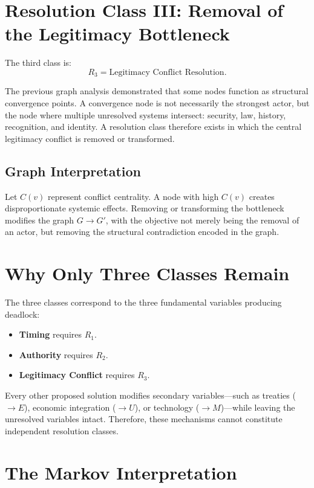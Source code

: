 \documentclass[11pt,openany]{book}
\theoremstyle{plain}
\theoremstyle{definition}
\begin{document}
\section*{Resolution Class III: Removal of the Legitimacy Bottleneck}

The third class is:
\[
R_3 = \text{Legitimacy Conflict Resolution}.
\]

The previous graph analysis demonstrated that some nodes function as structural convergence points. A convergence node is not necessarily the strongest actor, but the node where multiple unresolved systems intersect: security, law, history, recognition, and identity. A resolution class therefore exists in which the central legitimacy conflict is removed or transformed.

\subsection*{Graph Interpretation}

Let \(C(v)\) represent conflict centrality. A node with high \(C(v)\) creates disproportionate systemic effects. Removing or transforming the bottleneck modifies the graph \(G \to G'\), with the objective not merely being the removal of an actor, but removing the structural contradiction encoded in the graph.

\section*{Why Only Three Classes Remain}

The three classes correspond to the three fundamental variables producing deadlock:
\begin{itemize}
\item \textbf{Timing} requires \(R_1\).
\item \textbf{Authority} requires \(R_2\).
\item \textbf{Legitimacy Conflict} requires \(R_3\).
\end{itemize}

Every other proposed solution modifies secondary variables—such as treaties (\(\to E\)), economic integration (\(\to U\)), or technology (\(\to M\))—while leaving the unresolved variables intact. Therefore, these mechanisms cannot constitute independent resolution classes.

\section*{The Markov Interpretation}
\end{document}
